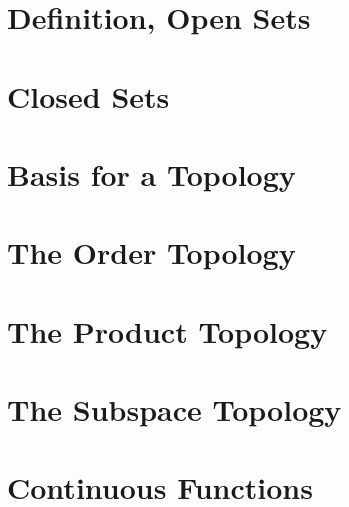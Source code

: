 \section{Definition, Open Sets}


\section{Closed Sets}


\section{Basis for a Topology}


\section{The Order Topology}


\section{The Product Topology}


\section{The Subspace Topology}


\section{Continuous Functions}


